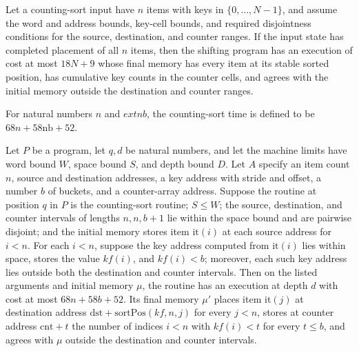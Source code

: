 \begin{theorem}
\label{Light.csShift_ends}
\leanok
{}
Let a counting-sort input have $n$ items with keys in $\{0,\ldots,N-1\}$, and assume the
word and address bounds, key-cell bounds, and required disjointness conditions for the
source, destination, and counter ranges. If the input state has completed placement of
all $n$ items, then the shifting program has an execution of cost at most $18N+9$ whose
final memory has every item at its stable sorted position, has cumulative key counts in
the counter cells, and agrees with the initial memory outside the destination and
counter ranges.
\end{theorem}

\begin{definition}
\label{Light.countSortTime}
\leanok
For natural numbers $n$ and $	ext{nb}$, the counting-sort time is defined to be
$68n+58\text{nb}+52$.
\end{definition}

\begin{theorem}
\label{Light.countSort_meets}
\leanok
{}
Let $P$ be a program, let $q,d$ be natural numbers, and let the machine limits have word
bound $W$, space bound $S$, and depth bound $D$. Let $A$ specify an item count $n$,
source and destination addresses, a key address with stride and offset, a number $b$ of
buckets, and a counter-array address. Suppose the routine at position $q$ in $P$ is the
counting-sort routine; $S\leq W$; the source, destination, and counter intervals of
lengths $n,n,b+1$ lie within the space bound and are pairwise disjoint; and the initial
memory stores item $\mathrm{it}(i)$ at each source address for $i<n$. For each $i<n$,
suppose the key address computed from $\mathrm{it}(i)$ lies within space, stores the
value $kf(i)$, and $kf(i)<b$; moreover, each such key address lies outside both the
destination and counter intervals. Then on the listed arguments and initial memory
$\mu$, the routine has an execution at depth $d$ with cost at most $68n+58b+52$. Its
final memory $\mu'$ places item $\mathrm{it}(j)$ at destination address
$\mathrm{dst}+\mathrm{sortPos}(kf,n,j)$ for every $j<n$, stores at counter address
$\mathrm{cnt}+t$ the number of indices $i<n$ with $kf(i)<t$ for every $t\leq b$, and
agrees with $\mu$ outside the destination and counter intervals.
\end{theorem}
